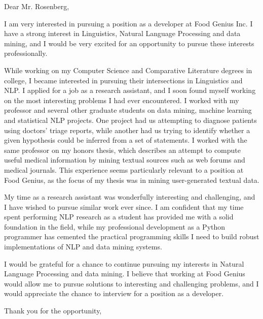 
\signature{Walter Askew\\
1341 N Campbell\\
Chicago, IL 60622}

\begin{letter}{}


\opening{Dear Mr. Rosenberg,}
  
I am very interested in pursuing a position as a
developer at Food Genius Inc.
I have a strong interest in Linguistics, Natural Language
Processing and data mining, and I would be very excited for an
opportunity to pursue these interests professionally.

While working on my Computer Science and Comparative Literature
degrees in college, I became interested in pursuing their intersections
in Linguistics and NLP.
I applied for a job as a research assistant, and I soon found myself
working on the most interesting problems I had ever encountered. 
I worked with my professor and several other graduate students on data
mining, machine learning and statistical NLP projects.
One project had us attempting to diagnose patients using doctors'
triage reports, while another had us trying to identify whether a
given hypothesis could be inferred from a set of statements.
I worked with the same professor on my honors thesis, which describes
an attempt to compute useful medical information by mining textual
sources such as  web forums and medical journals.
This experience seems particularly relevant to a position at Food
Genius, as the focus of my thesis was in mining user-generated textual
data. 

My time as a research assistant was wonderfully interesting and
challenging, and I have wished to pursue similar work ever since.
I am confident that my time spent performing NLP research as a student
has provided me with a solid foundation in the field, while my
professional development as a Python programmer has cemented the
practical programming skills I need to build robust implementations of
NLP and data mining systems. 

I would be grateful for a chance to continue pursuing my interests in
Natural Language Processing and data mining.  
I believe that working at Food Genius would allow me to pursue
solutions to interesting and challenging problems, and I would
appreciate the chance to interview for a position as a developer.

\closing{Thank you for the opportunity,}
\end{letter}

